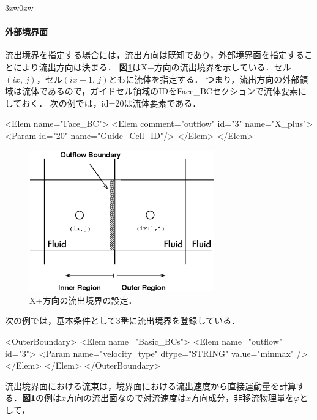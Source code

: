 \begin{indentation}{3zw}{0zw}
\paragraph{外部境界面}
流出境界を指定する場合には，流出方向は既知であり，外部境界面を指定することにより流出方向は決まる．
\textbf{図\ref{fig:outflow BC outer}}はX+方向の流出境界を示している．セル$(ix,\,j)$，セル$(ix+1,\,j)$ともに流体を指定する．
つまり，流出方向の外部領域は流体であるので，ガイドセル領域のIDをFace\_BCセクションで流体要素にしておく．
次の例では，id=20は流体要素である．

{\small
\begin{program}
<Elem name="Face_BC">
  <Elem comment="outflow" id="3" name="X_plus">
    <Param id="20" name="Guide_Cell_ID"/>
  </Elem>
</Elem>
\end{program}
}

\begin{figure}[htbp]
\begin{center}
\includegraphics[width=8cm,clip]{outflowBC_outer.eps}
\end{center}
\caption{X+方向の流出境界の設定．}
\label{fig:outflow BC outer}
\end{figure}

次の例では，基本条件として3番に流出境界を登録している．

{\small
\begin{program}
<OuterBoundary>
  <Elem name="Basic_BCs">
    <Elem name="outflow" id="3">
      <Param name="velocity_type" dtype="STRING" value="minmax" />
    </Elem>
  </Elem>
</OuterBoundary>
\end{program}
}

流出境界面における流束は，境界面における流出速度から直接運動量を計算する．\textbf{図\ref{fig:outflow BC outer}}の例は$x$方向の流出面なので対流速度は$x$方向成分，非移流物理量を$\varphi$として，


\end{indentation}
